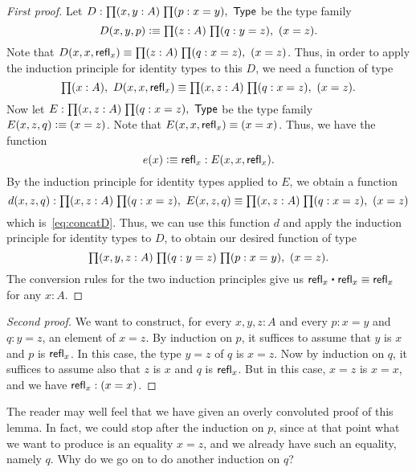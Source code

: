 \begin{proof}[First proof]
  Let $D:\prd{x,y:A}{p:x=y} \type$ be the type family
  \begin{equation*}
    D(x,y,p)\defeq \prd{z:A}{q:y=z} (x=z).
  \end{equation*}
  Note that $D(x,x,\refl x) \jdeq \prd{z:A}{q:x=z} (x=z)$.
  Thus, in order to apply the induction principle for identity types to this $D$, we need a function of type
  \begin{equation}\label{eq:concatD}
    \prd{x:A} D(x,x,\refl{x})
    \jdeq \prd{x,z:A}{q:x=z} (x=z).
  \end{equation}
  Now let $E:\prd{x,z:A}{q:x=z}\type$ be the type family $E(x,z,q)\vcentcolon\equiv (x=z)$.
  Note that $E(x,x,\mathsf{refl}_{x}) \equiv (x=x)$.
  Thus, we have the function
  \begin{equation*}
    e(x) \vcentcolon\equiv \mathsf{refl}_{x} : E(x,x,\mathsf{refl}_{x}).
  \end{equation*}
  By the induction principle for identity types applied to $E$, we obtain a function
  \begin{equation*}
    d(x,z,q) : \prd{x,z:A}{q:x=z} E(x,z,q) \jdeq \prd{x,z:A}{q:x=z} (x=z)
  \end{equation*}
  which is~\eqref{eq:concatD}.
  Thus, we can use this function $d$ and apply the induction principle for identity types to $D$, to obtain our desired function of type
  \begin{equation*}
    \prd{x,y,z:A}{q:y=z}{p:x=y} (x=z).
  \end{equation*}
  The conversion rules for the two induction principles give us $\refl{x}\ct \refl{x}\jdeq \refl{x}$ for any $x:A$.
\end{proof}

\begin{proof}[Second proof]
  We want to construct, for every $x,y,z:A$ and every $p:x=y$ and $q:y=z$, an element of $x=z$.
  By induction on $p$, it suffices to assume that $y$ is $x$ and $p$ is $\mathsf{refl}_{x}$.
  In this case, the type $y=z$ of $q$ is $x=z$.
  Now by induction on $q$, it suffices to assume also that $z$ is $x$ and $q$ is $\mathsf{refl}_{x}$.
  But in this case, $x=z$ is $x=x$, and we have $\mathsf{refl}_{x}:(x=x)$.
\end{proof}

The reader may well feel that we have given an overly convoluted proof of this lemma.
In fact, we could stop after the induction on $p$, since at that point what we want to produce is an equality $x=z$, and we already have such an equality, namely $q$.
Why do we go on to do another induction on $q$?

